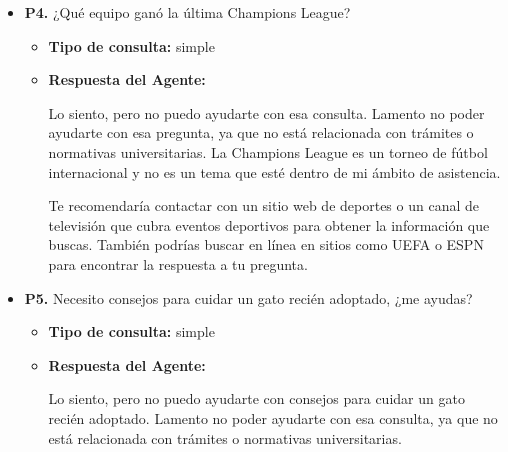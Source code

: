 \documentclass{article}
\begin{document}
\begin{itemize}
\begin{itemize}
                        Lo siento, pero no puedo ayudarte con la configuración del Bluetooth de tu coche. Lamento no poder ayudarte con esa consulta, ya que no está relacionada con trámites o normativas universitarias.

                        Te recomendaría contactar con el servicio técnico de tu coche o con el fabricante para obtener ayuda específica sobre cómo configurar el Bluetooth de tu vehículo. También podrías buscar en línea recursos y tutoriales que te puedan guiar a través del proceso.

                        Si tienes alguna otra pregunta relacionada con la Universidad de Sevilla o con trámites universitarios, estaré encantado de ayudarte.
            \end{itemize}

      \item \textbf{P4.} ¿Qué equipo ganó la última Champions League? \\
            \begin{itemize}
                  \item \textbf{Tipo de consulta:} simple
                  \item \textbf{Respuesta del Agente:}

                        Lo siento, pero no puedo ayudarte con esa consulta. Lamento no poder ayudarte con esa pregunta, ya que no está relacionada con trámites o normativas universitarias. La Champions League es un torneo de fútbol internacional y no es un tema que esté dentro de mi ámbito de asistencia.

                        Te recomendaría contactar con un sitio web de deportes o un canal de televisión que cubra eventos deportivos para obtener la información que buscas. También podrías buscar en línea en sitios como UEFA o ESPN para encontrar la respuesta a tu pregunta.
            \end{itemize}

      \item \textbf{P5.} Necesito consejos para cuidar un gato recién adoptado, ¿me ayudas? \\
            \begin{itemize}
                  \item \textbf{Tipo de consulta:} simple
                  \item \textbf{Respuesta del Agente:}

                        Lo siento, pero no puedo ayudarte con consejos para cuidar un gato recién adoptado. Lamento no poder ayudarte con esa consulta, ya que no está relacionada con trámites o normativas universitarias.


\end{itemize}
\end{itemize}
\end{document}
